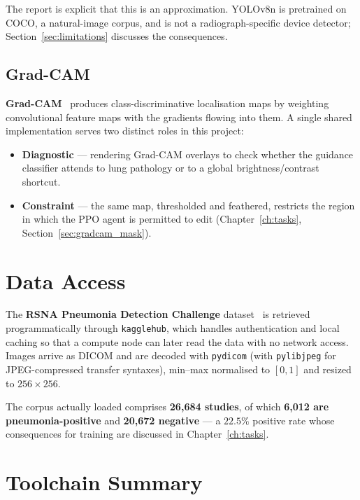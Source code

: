 The report is explicit that this is an approximation. YOLOv8n is
pretrained on COCO, a natural-image corpus, and is not a
radiograph-specific device detector; Section~\ref{sec:limitations}
discusses the consequences.

\subsection{Grad-CAM}

\textbf{Grad-CAM}~\cite{selvaraju2017gradcam} produces class-discriminative
localisation maps by weighting convolutional feature maps with the
gradients flowing into them. A single shared implementation serves two
distinct roles in this project:

\begin{itemize}[leftmargin=*]
  \item \textbf{Diagnostic} --- rendering Grad-CAM overlays to check
        whether the guidance classifier attends to lung pathology or to
        a global brightness/contrast shortcut.
  \item \textbf{Constraint} --- the same map, thresholded and feathered,
        restricts the region in which the PPO agent is permitted to edit
        (Chapter~\ref{ch:tasks}, Section~\ref{sec:gradcam_mask}).
\end{itemize}

\section{Data Access}

The \textbf{RSNA Pneumonia Detection Challenge} dataset~\cite{rsna2018}
is retrieved programmatically through \texttt{kagglehub}, which handles
authentication and local caching so that a compute node can later read
the data with no network access. Images arrive as DICOM and are decoded
with \texttt{pydicom} (with \texttt{pylibjpeg} for JPEG-compressed
transfer syntaxes), min--max normalised to $[0,1]$ and resized to
$256\times256$.

The corpus actually loaded comprises \textbf{26{,}684 studies}, of which
\textbf{6{,}012 are pneumonia-positive} and \textbf{20{,}672 negative} ---
a $22.5\%$ positive rate whose consequences for training are discussed
in Chapter~\ref{ch:tasks}.

\section{Toolchain Summary}

